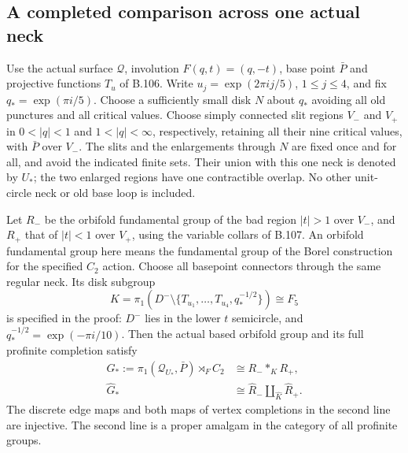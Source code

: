 \subsection*{A completed comparison across one actual neck}

\label{stmt:B108}
Use the actual surface $\mathscr Q$, involution $F(q,t)=(q,-t)$,
base point $\bar P$ and projective functions $T_u$ of B.106.
Write $u_j=\exp(2\pi i j/5)$, $1\leq j\leq4$, and fix
$q_*=\exp(\pi i/5)$. Choose a sufficiently small disk $N$ about
$q_*$ avoiding all old punctures and all critical values. Choose
simply connected slit regions $V_-$ and $V_+$ in $0<|q|<1$ and
$1<|q|<\infty$, respectively, retaining all their nine critical
values, with $\bar P$ over $V_-$. The slits and the enlargements
through $N$ are fixed once and for all, and avoid the indicated
finite sets. Their union with this one neck is denoted by $U_*$;
the two enlarged regions have one contractible overlap. No other
unit-circle neck or old base loop is included.

Let $R_-$ be the orbifold fundamental group of the bad region
$|t|>1$ over $V_-$, and $R_+$ that of $|t|<1$ over $V_+$,
using the variable collars of B.107. An orbifold fundamental group
here means the fundamental group of the Borel construction for
the specified $C_2$ action. Choose all basepoint connectors through
the same regular neck. Its disk subgroup
\[
 K=\pi_1(D^-\setminus\{T_{u_1},\ldots,T_{u_4},q_*^{-1/2}\})
       \cong F_5
\]
is specified in the proof: $D^-$ lies in the lower $t$ semicircle,
and $q_*^{-1/2}=\exp(-\pi i/10)$. Then the actual based orbifold
group and its full profinite completion satisfy
\begin{equation}\label{eq:B108-amalgams}
 \begin{aligned}
 G_*:=\pi_1(\mathscr Q_{U_*},\bar P)\rtimes_F C_2
      &\cong R_-*_{K}R_+,\\
 \widehat G_*&\cong
      \widehat R_-\amalg_{\widehat K}\widehat R_+.
 \end{aligned}
\end{equation}
The discrete edge maps and both maps of vertex completions in the
second line are injective. The second line is a proper amalgam
in the category of all profinite groups.

